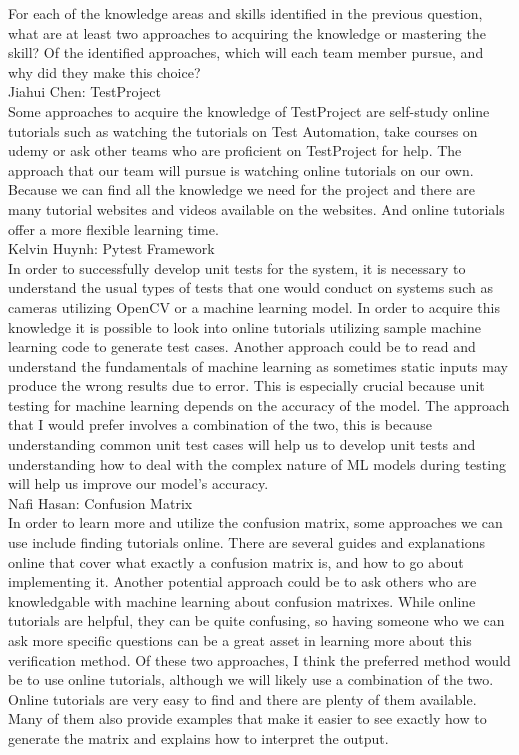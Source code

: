 \documentclass[12pt]{article}
\begin{document}
\begin{outline}[enumerate]
  \1 For each of the knowledge areas and skills identified in the previous question, what are at least two approaches to acquiring the knowledge or
  mastering the skill? Of the identified approaches, which will each team member pursue, and why did they make this choice?\\
    \2 Jiahui Chen: TestProject\\
    Some approaches to acquire the knowledge of TestProject are self-study online tutorials such as watching the tutorials on Test Automation, take courses on udemy or ask 
    other teams who are proficient on TestProject for help. The approach that our team will pursue is watching online tutorials on our own. Because we can find all the 
    knowledge we need for the project and there are many tutorial websites and videos available on the websites. And online tutorials offer a more flexible learning time.\\
    \2 Kelvin Huynh: Pytest Framework\\
    In order to successfully develop unit tests for the system, it is necessary to understand the usual types of tests that one would conduct on systems such as cameras 
    utilizing OpenCV or a machine learning model. In order to acquire this knowledge it is possible to look into online tutorials utilizing sample machine learning code to 
    generate test cases. Another approach could be to read and understand the fundamentals of machine learning as sometimes static inputs may produce the wrong results due 
    to error. This is especially crucial because unit testing for machine learning depends on the accuracy of the model. The approach that I would prefer involves a combination 
    of the two, this is because understanding common unit test cases will help us to develop unit tests and understanding how to deal with the complex nature of ML models 
    during testing will help us improve our model’s accuracy.\\
    \2 Nafi Hasan: Confusion Matrix\\
In order to learn more and utilize the confusion matrix, some approaches we can use include finding tutorials online. There are several guides and explanations online
that cover what exactly a confusion matrix is, and how to go about implementing it. Another potential approach could be to ask others who are knowledgable with machine 
learning about confusion matrixes. While online tutorials are helpful, they can be quite confusing, so having someone who we can ask more specific questions can be a 
great asset in learning more about this verification method. Of these two approaches, I think the preferred method would be to use online tutorials, although we will 
likely use a combination of the two. Online tutorials are very easy to find and there are plenty of them available. Many of them also provide examples that make it 
easier to see exactly how to generate the matrix and explains how to interpret the output.\\

  
\end{outline}
\end{document}
